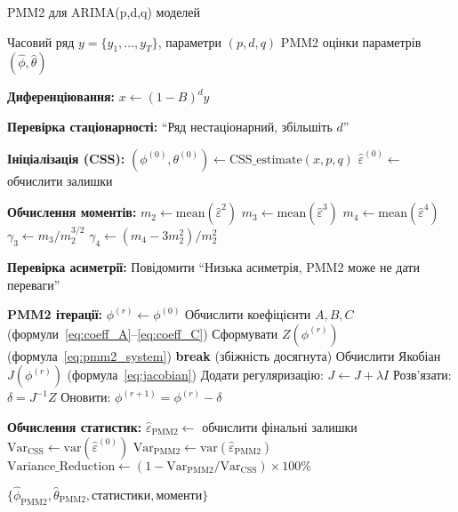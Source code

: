 \begin{algorithm}[H]
\caption{PMM2 для ARIMA(p,d,q) моделей}
\label{alg:pmm2_arima}
\begin{algorithmic}[1]
\REQUIRE Часовий ряд $y = \{y_1, \ldots, y_T\}$, параметри $(p,d,q)$
\ENSURE PMM2 оцінки параметрів $(\hat{\phi}, \hat{\theta})$

\STATE \textbf{Диференціювання:} $x \leftarrow (1-B)^d y$

\STATE \textbf{Перевірка стаціонарності:}
    \RETURN ``Ряд нестаціонарний, збільшіть $d$''
\ENDIF

\STATE \textbf{Ініціалізація (CSS):}
\STATE $(\phi^{(0)}, \theta^{(0)}) \leftarrow \text{CSS\_estimate}(x, p, q)$
\STATE $\hat{\varepsilon}^{(0)} \leftarrow$ обчислити залишки

\STATE \textbf{Обчислення моментів:}
\STATE $m_2 \leftarrow \text{mean}(\hat{\varepsilon}^2)$
\STATE $m_3 \leftarrow \text{mean}(\hat{\varepsilon}^3)$
\STATE $m_4 \leftarrow \text{mean}(\hat{\varepsilon}^4)$
\STATE $\gamma_3 \leftarrow m_3/m_2^{3/2}$
\STATE $\gamma_4 \leftarrow (m_4 - 3m_2^2)/m_2^2$

\STATE \textbf{Перевірка асиметрії:}
    \STATE Повідомити ``Низька асиметрія, PMM2 може не дати переваги''
\ENDIF

\STATE \textbf{PMM2 ітерації:}
\STATE $\phi^{(r)} \leftarrow \phi^{(0)}$
    \STATE Обчислити коефіцієнти $A, B, C$ (формули~\ref{eq:coeff_A}--\ref{eq:coeff_C})
    \STATE Сформувати $Z(\phi^{(r)})$ (формула~\ref{eq:pmm2_system})
        \STATE \textbf{break} (збіжність досягнута)
    \ENDIF
    \STATE Обчислити Якобіан $J(\phi^{(r)})$ (формула~\ref{eq:jacobian})
    \STATE Додати регуляризацію: $J \leftarrow J + \lambda I$
    \STATE Розв'язати: $\delta = J^{-1}Z$
    \STATE Оновити: $\phi^{(r+1)} = \phi^{(r)} - \delta$
\ENDFOR

\STATE \textbf{Обчислення статистик:}
\STATE $\hat{\varepsilon}_{\text{PMM2}} \leftarrow$ обчислити фінальні залишки
\STATE $\text{Var}_{\text{CSS}} \leftarrow \text{var}(\hat{\varepsilon}^{(0)})$
\STATE $\text{Var}_{\text{PMM2}} \leftarrow \text{var}(\hat{\varepsilon}_{\text{PMM2}})$
\STATE $\text{Variance\_Reduction} \leftarrow (1 - \text{Var}_{\text{PMM2}}/\text{Var}_{\text{CSS}}) \times 100\%$

\RETURN $\{\hat{\phi}_{\text{PMM2}}, \hat{\theta}_{\text{PMM2}}, \text{статистики}, \text{моменти}\}$
\end{algorithmic}
\end{algorithm}

